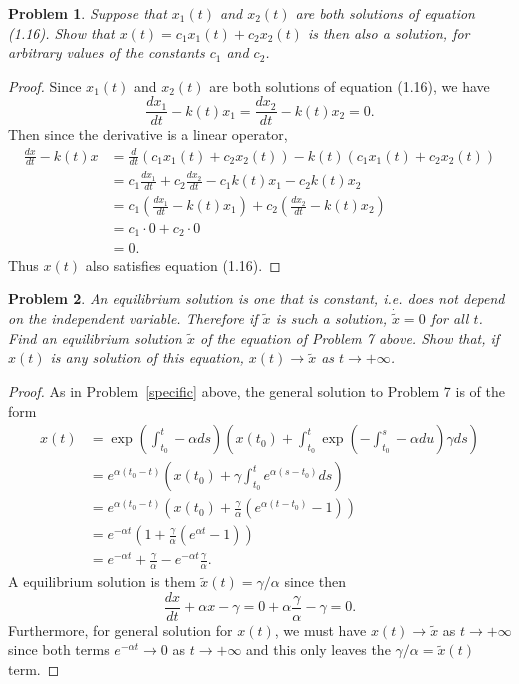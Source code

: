 \documentclass{article}
\newtheorem{problem}{Problem}
\begin{document}
\begin{problem}
Suppose that $x_1(t)$ and $x_2(t)$ are both solutions of equation (1.16). Show that $x(t) = c_1x_1(t) + c_2x_2(t)$ is then also a solution, for arbitrary values of the constants $c_1$ and $c_2$.
\end{problem}
\begin{proof}
Since $x_1(t)$ and $x_2(t)$ are both solutions of equation (1.16), we have
\[
\frac{dx_1}{dt} - k(t)x_1 = \frac{dx_2}{dt} - k(t)x_2 = 0.
\]
Then since the derivative is a linear operator,
\begin{align*}
\frac{dx}{dt} - k(t)x
&= \frac{d}{dt} (c_1x_1(t) + c_2x_2(t)) - k(t)(c_1x_1(t) + c_2x_2(t))\\
&= c_1 \frac{dx_1}{dt} + c_2 \frac{dx_2}{dt} - c_1k(t)x_1 - c_2k(t)x_2\\
&= c_1 \left ( \frac{dx_1}{dt} - k(t)x_1 \right ) + c_2 \left ( \frac{dx_2}{dt} - k(t)x_2 \right )\\
&= c_1 \cdot 0 + c_2 \cdot 0\\
&= 0.
\end{align*}
Thus $x(t)$ also satisfies equation (1.16).
\end{proof}

\begin{problem}
An \emph{equilibrium} solution is one that is constant, i.e. does not depend on the independent variable. Therefore if $\tilde{x}$ is such a solution, $\dot{\tilde{x}} = 0$ for all $t$. Find an equilibrium solution $\tilde{x}$ of the equation of Problem 7 above. Show that, if $x(t)$ is \emph{any} solution of this equation, $x(t) \rightarrow \tilde{x}$ as $t \rightarrow +\infty$.
\end{problem}
\begin{proof}
As in Problem~\ref{specific} above, the general solution to Problem 7 is of the form
\begin{align*}
x(t)
&= \exp \left ( \int_{t_0}^t -\alpha ds \right ) \left (x(t_0) + \int_{t_0}^t \exp \left ( - \int_{t_0}^s -\alpha du \right) \gamma ds \right )\\
&= e^{\alpha(t_0 - t)} \left (x(t_0) + \gamma \int_{t_0}^t e^{\alpha(s-t_0)} ds \right )\\
&= e^{\alpha(t_0 - t)} \left (x(t_0) + \frac{\gamma}{\alpha} \left (e^{\alpha(t-t_0)} - 1 \right ) \right )\\
&= e^{-\alpha t} \left ( 1 + \frac{\gamma}{\alpha} \left (e^{\alpha t} - 1 \right ) \right )\\
&= e^{-\alpha t} + \frac{\gamma}{\alpha} - e^{-\alpha t} \frac{\gamma}{\alpha}.
\end{align*}
A equilibrium solution is them $\tilde{x}(t) = \gamma/\alpha$ since then
\[
\frac{dx}{dt} + \alpha x - \gamma = 0 + \alpha \frac{\gamma}{\alpha} - \gamma = 0.
\]
Furthermore, for general solution for $x(t)$, we must have $x(t) \rightarrow \tilde{x}$ as $t \rightarrow + \infty$ since both terms $e^{-\alpha t} \rightarrow 0$ as $t \rightarrow + \infty$ and this only leaves the $\gamma/\alpha = \tilde{x}(t)$ term.
\end{proof}
\end{document}
